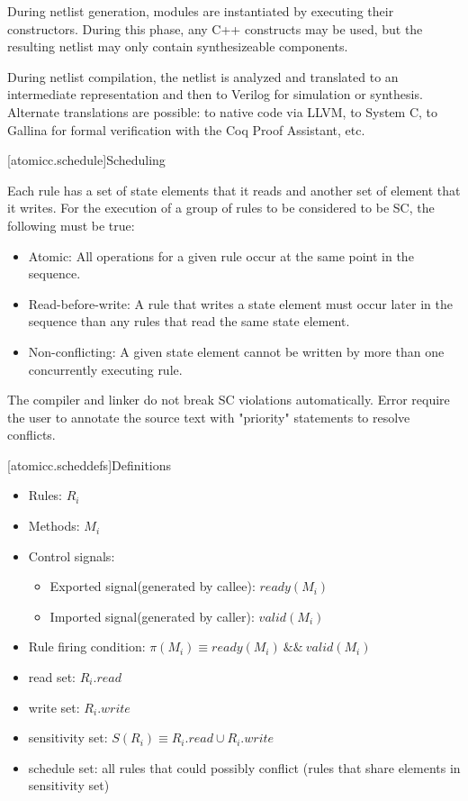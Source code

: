 During netlist
generation, modules are instantiated by executing their
constructors. During this phase, any C++ constructs may be used, but
the resulting netlist may only contain synthesizeable components.

During netlist compilation, the netlist is analyzed and translated to
an intermediate representation and then to Verilog for simulation or
synthesis. Alternate translations are possible: to native code via
LLVM, to System C, to Gallina for formal verification with the Coq
Proof Assistant, etc.

[atomicc.schedule]{Scheduling}

Each rule has a set of state elements that it reads and another set of element that it writes.
For the execution of a group of rules to be considered to be SC, the following must
be true:

\begin{itemize}
\item Atomic: All operations for a given rule occur at the same point in the sequence.
\item Read-before-write:  A rule that writes a state element must occur later in the sequence
than any rules that read the same state element.
\item Non-conflicting: A given state element cannot be written by more than one concurrently executing rule.
\end{itemize}

The compiler and linker do not break SC violations automatically. Error require the user to annotate
the source text with "priority" statements to resolve conflicts.

[atomicc.scheddefs]{Definitions}
\begin{itemize}
\item Rules: $R_{i}$
\item Methods: $M_{i}$
\item Control signals:
\begin {itemize}
\item Exported signal(generated by callee):  $ready(M_{i})$
\item Imported signal(generated by caller):  $valid(M_{i})$
\end{itemize}
\item Rule firing condition: $\pi(M_{i}) \equiv ready(M_{i})\ \&\&\ valid(M_{i})$
\item read set: $R_{i}.read$
\item write set: $R_{i}.write$
\item sensitivity set: $S(R_{i}) \equiv R_{i}.read \cup R_{i}.write$
\item schedule set: all rules that could possibly conflict (rules that share elements in sensitivity set)
\end{itemize}

